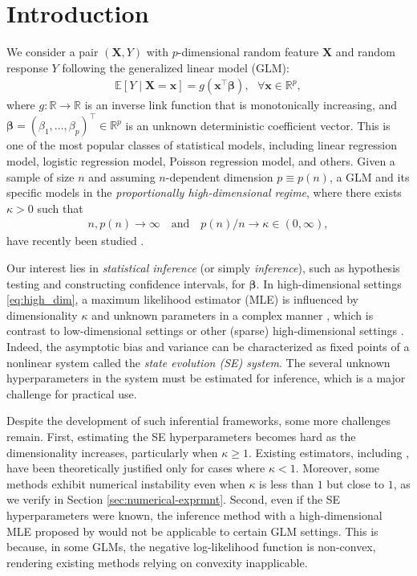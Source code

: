\documentclass[12pt,reqno]{amsart}
\newcommand{\rbr}[1]{\left(#1\right)}
\newcommand{\R}{\mathbb{R}}
\newcommand{\E}{\mathbb{E}}
\newcommand{\rc}{\color{black}}
\newcommand{\cc}{\color{black}}
\def\bx{\bm{x}}
\def\bX{\bm{X}}
\def\bbeta{\bm{\beta}}
\begin{document}
\section{Introduction}
We consider a pair $(\bX,Y)$ with $p$-dimensional random feature $\bX$ and random response $Y$ following the generalized linear model (GLM):
\begin{align}
\label{eq:model}
    \E[Y\mid\bX=\bx]=g\rbr{\bx^\top\bbeta}, ~~~ \forall \bx \in \mathbb{R}^p,
\end{align}
where $g:\R \to \R$ is an inverse link function that {\cc is monotonically increasing}, and $\bbeta = (\beta_1,\dots,\beta_p)^\top \in\R^p$ is an unknown deterministic coefficient vector. 
This is one of the most popular classes of statistical models, including linear regression model, logistic regression model, Poisson regression model, and others. Given a sample of size $n$ and assuming $n$-dependent dimension $p\equiv p(n)$, a GLM and its specific models in the \textit{proportionally high-dimensional regime}, where there exists $\kappa>0$ such that
\begin{align}
    n,p(n) \to \infty \mbox{~~~and~~~} p(n)/n \to \kappa\in(0,\infty), \label{eq:high_dim}
\end{align}
have recently been studied \citep{bayati2011dynamics,rangan2011generalized,el2013robust,thrampoulidis2018precise,sur2019modern,barbier2019optimal,bellec2025observable}.


{\rc 
Our interest lies in \textit{statistical inference} (or simply \textit{inference}), such as hypothesis testing and constructing confidence intervals, for $\bbeta$.
In high-dimensional settings \eqref{eq:high_dim}, a maximum likelihood estimator (MLE) is influenced by dimensionality $\kappa$ and unknown parameters in a complex manner \cite{sur2019likelihood,sur2019modern,salehi2019impact,barbier2019optimal,feng2022unifying}, which is contrast to low-dimensional settings \cite{mccullagh1980regression,cordeiro1983improved} or other (sparse) high-dimensional settings \cite{van2014asymptotically,tian2017asymptotics,fei2021estimation,cai2023statistical,ponnet2024robust}.
Indeed, the asymptotic bias and variance can be characterized as fixed points of a nonlinear system called the \textit{state evolution (SE) system}. 
The several unknown hyperparameters in the system must be estimated for inference, which is a major challenge for practical use.
}


Despite the development of such inferential frameworks, some more challenges remain. 
First, estimating the SE hyperparameters becomes hard as the dimensionality increases, particularly when $\kappa \geq 1$. Existing estimators, including \cite{sur2019modern,yadlowsky2021sloe,chen2024method}, have been theoretically justified only for cases where $\kappa < 1$. Moreover, some methods exhibit numerical instability even when $\kappa$ is less than $1$ but close to $1$, as we verify in Section \ref{sec:numerical-exprmnt}.
Second, even if the SE hyperparameters were known, the inference method with a high-dimensional MLE proposed by \cite{sur2019modern} would not be applicable to certain GLM settings. This is because, in some GLMs, the negative log-likelihood function is non-convex, rendering existing methods relying on convexity inapplicable.
\end{document}
